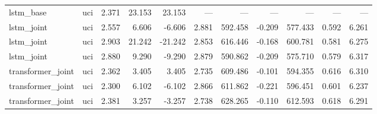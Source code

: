 \begin{table}
\begin{tabular}{llrrrrrrrrr}
lstm_base & uci & 2.371 & 23.153 & 23.153 & — & — & — & — & — & — \\
lstm_joint & uci & 2.557 & 6.606 & -6.606 & 2.881 & 592.458 & -0.209 & 577.433 & 0.592 & 6.261 \\
lstm_joint & uci & 2.903 & 21.242 & -21.242 & 2.853 & 616.446 & -0.168 & 600.781 & 0.581 & 6.275 \\
lstm_joint & uci & 2.880 & 9.290 & -9.290 & 2.879 & 590.862 & -0.209 & 575.710 & 0.579 & 6.317 \\
transformer_joint & uci & 2.362 & 3.405 & 3.405 & 2.735 & 609.486 & -0.101 & 594.355 & 0.616 & 6.310 \\
transformer_joint & uci & 2.300 & 6.102 & -6.102 & 2.866 & 611.862 & -0.221 & 596.451 & 0.601 & 6.237 \\
transformer_joint & uci & 2.381 & 3.257 & -3.257 & 2.738 & 628.265 & -0.110 & 612.593 & 0.618 & 6.291 \\
\bottomrule
\end{tabular}
\end{table}
